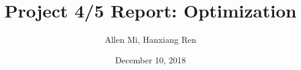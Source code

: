 \title{Project 4/5 Report: Optimization}
\author{Allen Mi, Hanxiang Ren}
\date{December 10, 2018}
\newcommand{\reportfile}{scalars_report_4+5.tex}